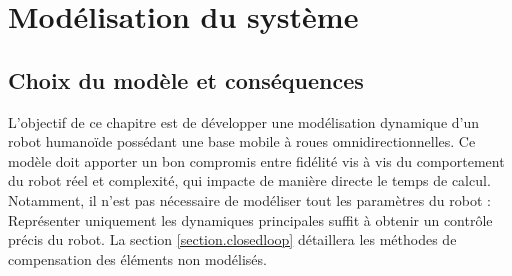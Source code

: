 \chapter{Modélisation du système}
\section{Choix du modèle et conséquences}

	L'objectif de ce chapitre est de développer une modélisation dynamique d'un robot humanoïde possédant une base mobile à roues omnidirectionnelles. 
	Ce modèle doit apporter un bon compromis entre fidélité vis à vis du comportement du robot réel et complexité, qui impacte de manière directe le temps de calcul.
	Notamment, il n'est pas nécessaire de modéliser tout les paramètres du robot : Représenter uniquement les dynamiques principales suffit à obtenir un contrôle précis du robot. 
	La section \ref{section.closedloop} détaillera les méthodes de compensation des éléments non modélisés.
	
